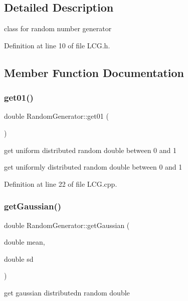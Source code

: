 \subsection{Detailed Description}
class for random number generator 

Definition at line 10 of file L\+C\+G.\+h.



\subsection{Member Function Documentation}
\mbox{\label{class_random_generator_a19c38cf91e2081794c3fba0c4e15292e}} 
\subsubsection{\texorpdfstring{get01()}{get01()}}
{\footnotesize\ttfamily double Random\+Generator\+::get01 (\begin{DoxyParamCaption}{ }\end{DoxyParamCaption})}



get uniform distributed random double between 0 and 1 

get uniformly distributed random double between 0 and 1 

Definition at line 22 of file L\+C\+G.\+cpp.

\mbox{\label{class_random_generator_a3b3fb0a7f79a648b1dd8a9c52791408b}} 
\subsubsection{\texorpdfstring{getGaussian()}{getGaussian()}}
{\footnotesize\ttfamily double Random\+Generator\+::get\+Gaussian (\begin{DoxyParamCaption}\item[{double}]{mean,  }\item[{double}]{sd }\end{DoxyParamCaption})}



get gaussian distributedn random double 

